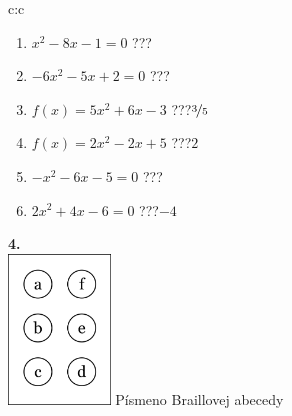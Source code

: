 \documentclass[10pt]{report}
\begin{document}
\begin{tabular}{c:c}
\begin{minipage}[c][104.5mm][t]{0.5\linewidth}
\begin{center}
\begin{minipage}{0.79\linewidth}
\begin{center}
\begin{varwidth}{\linewidth}
\begin{enumerate}
\Large
\item $x^2-8x-1=0$\quad \dotfill\; ???\;\dotfill {}
\item $-6x^2-5x+2=0$\quad \dotfill\; ???\;\dotfill {}
\item $f(x)=5x^2+6x-3$\quad \dotfill\; ???\;\dotfill \quad $\nicefrac{3}{5}$
\item $f(x)=2x^2-2x+5$\quad \dotfill\; ???\;\dotfill \quad $2$
\item $-x^2-6x-5=0$\quad \dotfill\; ???\;\dotfill {}
\item $2x^2+4x-6=0$\quad \dotfill\; ???\;\dotfill \quad $-4$
\end{enumerate}
\end{varwidth}
\end{center}
\end{minipage}
\begin{minipage}{0.20\linewidth}
\begin{center}
{\Huge\bfseries 4.} \\[2mm]
\includegraphics[height=40mm]{../images/braille.png}
{\small Písmeno Braillovej abecedy}
\end{center}
\end{minipage}
\end{center}
\end{minipage}
%
\end{tabular}
\newpage
\thispagestyle{empty}
\end{document}

